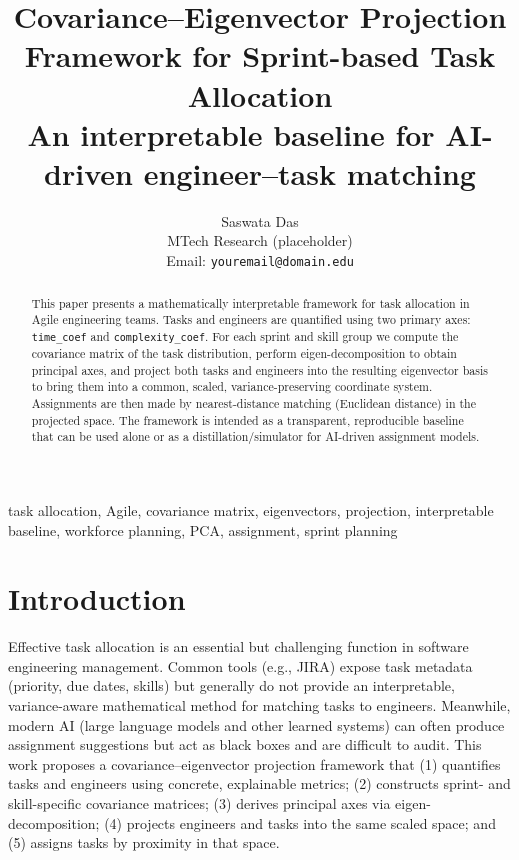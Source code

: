 \documentclass[journal]{IEEEtran}
\begin{document}
\title{Covariance--Eigenvector Projection Framework for Sprint-based Task Allocation\\
\large An interpretable baseline for AI-driven engineer–task matching}

\author{Saswata Das\\
\small MTech Research (placeholder)\\
\small Email: \texttt{youremail@domain.edu}} %

\maketitle

\begin{abstract}
This paper presents a mathematically interpretable framework for task allocation in Agile engineering teams. Tasks and engineers are quantified using two primary axes: \texttt{time\_coef} and \texttt{complexity\_coef}. For each sprint and skill group we compute the covariance matrix of the task distribution, perform eigen-decomposition to obtain principal axes, and project both tasks and engineers into the resulting eigenvector basis to bring them into a common, scaled, variance-preserving coordinate system. Assignments are then made by nearest-distance matching (Euclidean distance) in the projected space. The framework is intended as a transparent, reproducible baseline that can be used alone or as a distillation/simulator for AI-driven assignment models.
\end{abstract}

\begin{IEEEkeywords}
task allocation, Agile, covariance matrix, eigenvectors, projection, interpretable baseline, workforce planning, PCA, assignment, sprint planning
\end{IEEEkeywords}

\section{Introduction}\label{sec:intro}
Effective task allocation is an essential but challenging function in software engineering management. Common tools (e.g., JIRA) expose task metadata (priority, due dates, skills) but generally do not provide an interpretable, variance-aware mathematical method for matching tasks to engineers. Meanwhile, modern AI (large language models and other learned systems) can often produce assignment suggestions but act as black boxes and are difficult to audit. This work proposes a covariance--eigenvector projection framework that (1) quantifies tasks and engineers using concrete, explainable metrics; (2) constructs sprint- and skill-specific covariance matrices; (3) derives principal axes via eigen-decomposition; (4) projects engineers and tasks into the same scaled space; and (5) assigns tasks by proximity in that space.
\end{document}
